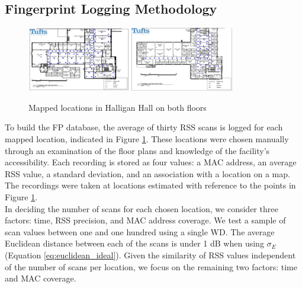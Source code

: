 \documentclass[conference]{IEEEtran}
\begin{document}
\subsection{Fingerprint Logging Methodology}

\begin{figure}[t!] 
  \centering
    \includegraphics[width=0.4\textwidth]{Floor1.png}
    \includegraphics[width=0.4\textwidth]{Floor2.png}
     \caption{Mapped locations in Halligan Hall on both floors}
     \label{fig:mapped_positions}
\end{figure}


To build the FP database, the average of thirty RSS scans is logged for each mapped location, indicated in Figure \ref{fig:mapped_positions}. These locations were chosen manually through an examination of the floor plans and knowledge of the facility's accessibility. Each recording is stored as four values: a MAC address, an average RSS value, a standard deviation, and an association with a location on a map. The recordings were taken at locations estimated with reference to the points in Figure \ref{fig:mapped_positions}.\\
\indent In deciding the number of scans for each chosen location, we consider three factors: time, RSS precision, and MAC address coverage. We test a sample of scan values between one and one hundred using a single WD. The average Euclidean distance between each of the scans is under 1 dB when using $\sigma_E$ (Equation \ref{eq:euclidean_ideal}). Given the similarity of RSS values independent of the number of scans per location, we focus on the remaining two factors: time and MAC coverage. 


\begin{table}[!t]
\renewcommand{\arraystretch}{1.3}
\caption{Floor Recording Times (average 1.5 sec/scan)}
\label{tab:table_floor_times}
\centering
{}
\end{table}
\end{document}
